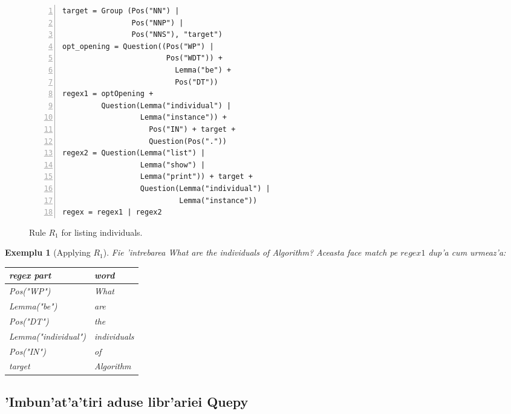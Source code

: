 \documentclass[12pt,a4paper,twoside]{report}
\newtheorem{example}{Exemplu}
\begin{document}
\begin{figure}[h]
\centering
\begin{lstlisting}[basicstyle=\footnotesize, numbers=left, xleftmargin=.05\textwidth]
target = Group (Pos("NN") | 
                Pos("NNP") | 
                Pos("NNS"), "target")
opt_opening = Question((Pos("WP") | 
                        Pos("WDT")) + 
                          Lemma("be") + 
                          Pos("DT"))
regex1 = optOpening + 
         Question(Lemma("individual") | 
                  Lemma("instance")) + 
                    Pos("IN") + target + 
                    Question(Pos("."))
regex2 = Question(Lemma("list") | 
                  Lemma("show") | 
                  Lemma("print")) + target +   
                  Question(Lemma("individual") |
                           Lemma("instance"))
regex = regex1 | regex2
  \end{lstlisting}
        \caption{Rule $R_1$ for listing individuals.}
      \label{fig:r1}
  \end{figure}
  
  \begin{example}[Applying $R_1$] 
  Fie 'intrebarea {\it What are the individuals of Algorithm?}
  Aceasta face match pe $regex1$ dup'a cum urmeaz'a:
  
 \begin{center}
      \begin{tabular}{ll}
      regex part & word\\ \hline
      
  {\it Pos("WP")} & What\\
  {\it Lemma("be")} & are\\
  {\it Pos("DT")} & the\\
  {\it Lemma("individual")} & individuals\\
  {\it Pos("IN")} & of\\
  {\it target} & Algorithm\\
       \end{tabular}
       \end{center}
        \vspace{0.3cm}
   \end{example}
 

\subsection{'Imbun'at'a'tiri aduse libr'ariei Quepy}
\end{document}
